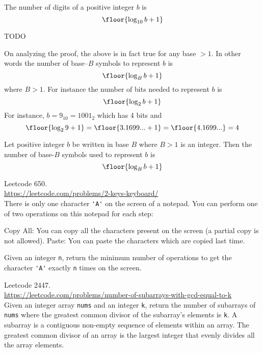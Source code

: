 \begin{prop}
  The number of digits of a positive integer $b$ is
  \[
  \floor{\log_{10} b + 1}
  \]
\end{prop}
\proof
TODO

On analyzing the proof, the above is in fact true for any base $> 1$.
In other words the number of base--$B$ symbols to represent $b$ is
\[
\floor{\log_{B} b + 1}
\]
where $B > 1$.
For instance the number of bits needed to represent $b$ is
\[
\floor{\log_{2} b + 1}
\]
For instance, $b = 9_{10} = 1001_2$ which has 4 bits and
\[
\floor{\log_{2} 9 + 1}
= \floor{3.1699... + 1}
= \floor{4.1699...}
= 4
\]

\begin{prop}
  Let positive integer $b$ be written in base $B$ where $B > 1$ is an integer.
  Then the number of base-$B$ symbols used to represent $b$ is
  \[
  \floor{\log_{B} b + 1}
  \]
\end{prop}

\begin{ex}
  Leetcode 650.
  \\
  \url{https://leetcode.com/problems/2-keys-keyboard/}
  \\
  There is only one character \verb!'A'! on the screen of a notepad.
  You can perform one of two operations on this notepad for each step:
  \begin{enumerate}[nosep]
    \li Copy All:
    You can copy all the characters present on the screen (a partial copy is
    not allowed).
    \li Paste: You can paste the characters which are copied last time.
  \end{enumerate}
  Given an integer \verb!n!, return the minimum number of operations to get the character \verb!'A'! exactly \verb!n! times on the screen.
\end{ex}


\begin{ex}
  Leetcode 2447.
  \\
  \url{https://leetcode.com/problems/number-of-subarrays-with-gcd-equal-to-k}
  \\
  Given an integer array \verb!nums! and an integer \verb!k!,
  return the number of subarrays of \verb!nums! where the greatest common
  divisor
  of the subarray's elements is \verb!k!.
  A subarray is a contiguous non-empty sequence of elements within an array.
  The greatest common divisor of an array is the largest integer that evenly
  divides all the array elements.
\end{ex}

